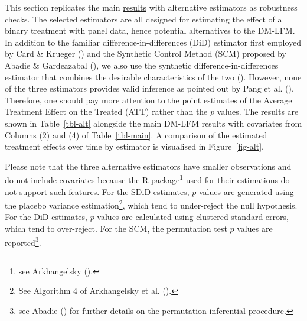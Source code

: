 \documentclass[
  a4paper,
  abstract=true]{scrartcl}
\theoremstyle{definition}
\begin{document}
This section replicates the main \hyperref[sec-results]{results} with
alternative estimators as robustness checks. The selected estimators are
all designed for estimating the effect of a binary treatment with panel
data, hence potential alternatives to the DM-LFM. In addition to the
familiar difference-in-differences (DiD) estimator first employed by
Card \& Krueger () and the Synthetic
Control Method (SCM) proposed by Abadie \& Gardeazabal
(), we also use the synthetic
difference-in-differences estimator that combines the desirable
characteristics of the two (). However, none of the three estimators provides valid
inference as pointed out by Pang et al. ().
Therefore, one should pay more attention to the point estimates of the
Average Treatment Effect on the Treated (ATT) rather than the \(p\)
values. The results are shown in Table~\ref{tbl-alt} alongside the main
DM-LFM results with covariates from Columns (2) and (4) of
Table~\ref{tbl-main}. A comparison of the estimated treatment effects
over time by estimator is visualised in Figure~\ref{fig-alt}.

Please note that the three alternative estimators have smaller
observations and do not include covariates because the R
package\footnote{see Arkhangelsky ().}
used for their estimations do not support such features. For the SDiD
estimates, \(p\) values are generated using the placebo variance
estimation\footnote{See Algorithm 4 of Arkhangelsky et al.
  ().}, which tend to under-reject
the null hypothesis. For the DiD estimates, \(p\) values are calculated
using clustered standard errors, which tend to over-reject. For the SCM,
the permutation test \(p\) values are reported\footnote{see Abadie
  () for further details on the
  permutation inferential procedure.}.
\end{document}
